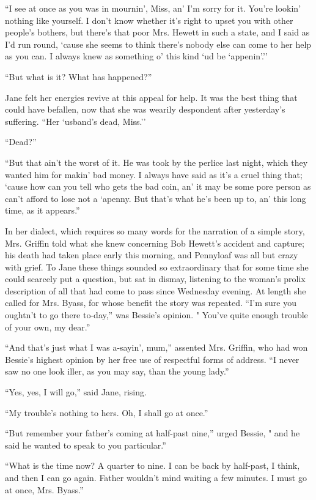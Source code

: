 {\protect\hypertarget{221}{}{}}``I see at once as you was in mournin',
Miss, an' I'm sorry for it. You're lookin' nothing like yourself. I
don't know whether it's right to upset you with other people's bothers,
but there's that poor Mrs. Hewett in such a state, and I said as I'd run
round, `cause she seems to think there's nobody else can come to her
help as you can. I always knew as something o' this kind `ud be
`appenin'.''

``But what is it? What has happened?''

Jane felt her energies revive at this appeal for help. It was the best
thing that could have befallen, now that she was wearily despondent
after yesterday's suffering. ``Her `usband's dead, Miss.''

``Dead?''

``But that ain't the worst of it. He was took by the perlice last night,
which they wanted him for makin' bad money. I always have said as it's a
cruel thing that; `cause how can you tell who gets the bad coin, an' it
may be some pore person as can't afford to lose not a `apenny. But
that's what he's been up to, an' this long time, as it appears.''

In her dialect, which requires so many words for the narration of a
simple story, Mrs. Griffin {\protect\hypertarget{222}{}{}}told what she
knew concerning Bob Hewett's accident and capture; his death had taken
place early this morning, and Pennyloaf was all but crazy with grief. To
Jane these things sounded so extraordinary that for some time she could
scarcely put a question, but sat in dismay, listening to the woman's
prolix description of all that had come to pass since Wednesday evening.
At length she called for Mrs. Byass, for whose benefit the story was
repeated. ``I'm sure you oughtn't to go there to-day,'' was Bessie's
opinion. " You've quite enough trouble of your own, my dear.''

``And that's just what I was a-sayin', mum,'' assented Mrs. Griffin, who
had won Bessie's highest opinion by her free use of respectful forms of
address. ``I never saw no one look iller, as you may say, than the young
lady.''

``Yes, yes, I will go,'' said Jane, rising.

``My trouble's nothing to hers. Oh, I shall go at once.''

``But remember your father's coming at half-past nine,'' urged Bessie, "
and he said he wanted to speak to you particular.''

``What is the time now? A quarter to
{\protect\hypertarget{223}{}{}}nine. I can be back by half-past, I
think, and then I can go again. Father wouldn't mind waiting a few
minutes. I must go at once, Mrs. Byass.''

